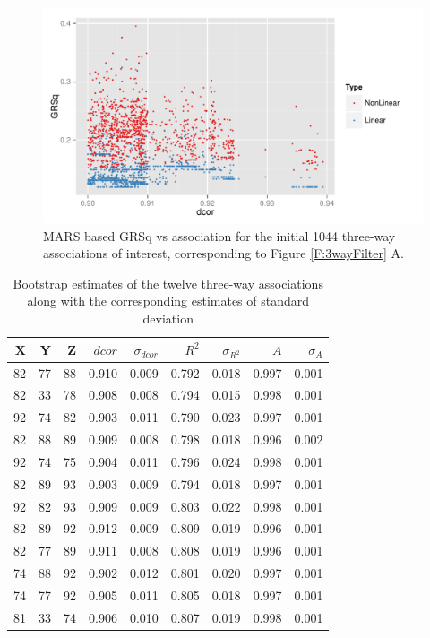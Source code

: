 \documentclass[a4paper, 12pt]{report}
\begin{document}
\begin{figure}[H]
\begin{centering}
\includegraphics[width=\textwidth]{grsqVdcor3way.pdf}
\caption{MARS based GRSq vs association for the initial 1044 three-way associations of interest, corresponding to Figure \ref{F:3wayFilter} A.} 
\label{F:GRSqvAssociation3way}
\end{centering}
\end{figure}

\begin{table}[H]
\begin{centering}
\begin{tabular}{rrrrrrrrr}
  \hline
 X & Y & Z & $dcor$ & $\sigma_{dcor}$ & $R^2$ & $\sigma_{R^2}$ & $A$ & $\sigma_A$ \\ 
  \hline
82 &   77 &   88 & 0.910 & 0.009 & 0.792 & 0.018 & 0.997 & 0.001 \\ 
 82 &   33 &   78 & 0.908 & 0.008 & 0.794 & 0.015 & 0.998 & 0.001 \\ 
 92 &   74 &   82 & 0.903 & 0.011 & 0.790 & 0.023 & 0.997 & 0.001 \\ 
  82 &   88 &   89 & 0.909 & 0.008 & 0.798 & 0.018 & 0.996 & 0.002 \\ 
  92 &   74 &   75 & 0.904 & 0.011 & 0.796 & 0.024 & 0.998 & 0.001 \\ 
  82 &   89 &   93 & 0.903 & 0.009 & 0.794 & 0.018 & 0.997 & 0.001 \\ 
  92 &   82 &   93 & 0.909 & 0.009 & 0.803 & 0.022 & 0.998 & 0.001 \\ 
  82 &   89 &   92 & 0.912 & 0.009 & 0.809 & 0.019 & 0.996 & 0.001 \\ 
  82 &   77 &   89 & 0.911 & 0.008 & 0.808 & 0.019 & 0.996 & 0.001 \\ 
  74 &   88 &   92 & 0.902 & 0.012 & 0.801 & 0.020 & 0.997 & 0.001 \\ 
 74 &   77 &   92 & 0.905 & 0.011 & 0.805 & 0.018 & 0.997 & 0.001 \\ 
  81 &   33 &   74 & 0.906 & 0.010 & 0.807 & 0.019 & 0.998 & 0.001 \\ 
   \hline
\end{tabular}
\caption{Bootstrap estimates of the twelve three-way associations along with the corresponding estimates of standard deviation} 
\label{tabsmall}
\end{centering}
\end{table}
\end{document}

